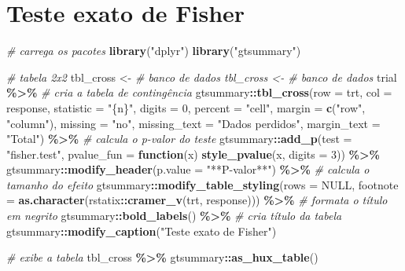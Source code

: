\documentclass[
]{book}
\newenvironment{Shaded}{\begin{snugshade}}{\end{snugshade}}
\newcommand{\AttributeTok}[1]{\textcolor[rgb]{0.13,0.29,0.53}{#1}}
\newcommand{\CommentTok}[1]{\textcolor[rgb]{0.56,0.35,0.01}{\textit{#1}}}
\newcommand{\ConstantTok}[1]{\textcolor[rgb]{0.56,0.35,0.01}{#1}}
\newcommand{\ControlFlowTok}[1]{\textcolor[rgb]{0.13,0.29,0.53}{\textbf{#1}}}
\newcommand{\DecValTok}[1]{\textcolor[rgb]{0.00,0.00,0.81}{#1}}
\newcommand{\FunctionTok}[1]{\textcolor[rgb]{0.13,0.29,0.53}{\textbf{#1}}}
\newcommand{\NormalTok}[1]{#1}
\newcommand{\OtherTok}[1]{\textcolor[rgb]{0.56,0.35,0.01}{#1}}
\newcommand{\SpecialCharTok}[1]{\textcolor[rgb]{0.81,0.36,0.00}{\textbf{#1}}}
\newcommand{\StringTok}[1]{\textcolor[rgb]{0.31,0.60,0.02}{#1}}
\begin{document}
\hypertarget{teste-exato-de-fisher}{%
\section{Teste exato de Fisher}\label{teste-exato-de-fisher}}

\begin{Shaded}
\begin{Highlighting}[]
\CommentTok{\# carrega os pacotes}
\FunctionTok{library}\NormalTok{(}\StringTok{"dplyr"}\NormalTok{)}
\FunctionTok{library}\NormalTok{(}\StringTok{"gtsummary"}\NormalTok{)}

\CommentTok{\# tabela 2x2}
\NormalTok{tbl\_cross }\OtherTok{\textless{}{-}} \CommentTok{\# banco de dados tbl\_cross \textless{}{-} \# banco de dados}
\NormalTok{trial }\SpecialCharTok{\%\textgreater{}\%}
    \CommentTok{\# cria a tabela de contingência}
\NormalTok{gtsummary}\SpecialCharTok{::}\FunctionTok{tbl\_cross}\NormalTok{(}\AttributeTok{row =}\NormalTok{ trt, }\AttributeTok{col =}\NormalTok{ response, }\AttributeTok{statistic =} \StringTok{"\{n\}"}\NormalTok{, }\AttributeTok{digits =} \DecValTok{0}\NormalTok{, }\AttributeTok{percent =} \StringTok{"cell"}\NormalTok{,}
    \AttributeTok{margin =} \FunctionTok{c}\NormalTok{(}\StringTok{"row"}\NormalTok{, }\StringTok{"column"}\NormalTok{), }\AttributeTok{missing =} \StringTok{"no"}\NormalTok{, }\AttributeTok{missing\_text =} \StringTok{"Dados perdidos"}\NormalTok{,}
    \AttributeTok{margin\_text =} \StringTok{"Total"}\NormalTok{) }\SpecialCharTok{\%\textgreater{}\%}
    \CommentTok{\# calcula o p{-}valor do teste}
\NormalTok{gtsummary}\SpecialCharTok{::}\FunctionTok{add\_p}\NormalTok{(}\AttributeTok{test =} \StringTok{"fisher.test"}\NormalTok{, }\AttributeTok{pvalue\_fun =} \ControlFlowTok{function}\NormalTok{(x) }\FunctionTok{style\_pvalue}\NormalTok{(x, }\AttributeTok{digits =} \DecValTok{3}\NormalTok{)) }\SpecialCharTok{\%\textgreater{}\%}
\NormalTok{    gtsummary}\SpecialCharTok{::}\FunctionTok{modify\_header}\NormalTok{(}\AttributeTok{p.value =} \StringTok{"**P{-}valor**"}\NormalTok{) }\SpecialCharTok{\%\textgreater{}\%}
    \CommentTok{\# calcula o tamanho do efeito}
\NormalTok{gtsummary}\SpecialCharTok{::}\FunctionTok{modify\_table\_styling}\NormalTok{(}\AttributeTok{rows =} \ConstantTok{NULL}\NormalTok{, }\AttributeTok{footnote =} \FunctionTok{as.character}\NormalTok{(rstatix}\SpecialCharTok{::}\FunctionTok{cramer\_v}\NormalTok{(trt,}
\NormalTok{    response))) }\SpecialCharTok{\%\textgreater{}\%}
    \CommentTok{\# formata o título em negrito}
\NormalTok{gtsummary}\SpecialCharTok{::}\FunctionTok{bold\_labels}\NormalTok{() }\SpecialCharTok{\%\textgreater{}\%}
    \CommentTok{\# cria título da tabela}
\NormalTok{gtsummary}\SpecialCharTok{::}\FunctionTok{modify\_caption}\NormalTok{(}\StringTok{"Teste exato de Fisher"}\NormalTok{)}

\CommentTok{\# exibe a tabela}
\NormalTok{tbl\_cross }\SpecialCharTok{\%\textgreater{}\%}
\NormalTok{    gtsummary}\SpecialCharTok{::}\FunctionTok{as\_hux\_table}\NormalTok{()}
\end{Highlighting}
\end{Shaded}
\end{document}
